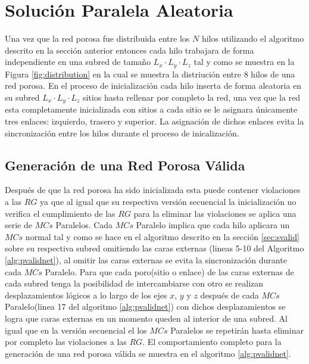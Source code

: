 \section{Solución Paralela Aleatoria}
\label{sec:pbiasedrg}
Una vez que la red porosa fue distribuida entre los $N$ hilos utilizando el algoritmo descrito en la sección anterior entonces cada hilo trabajara de forma independiente en una subred de tamaño $L_x \cdot L_y \cdot L_z$ tal y como se muestra en la Figura \ref{fig:distribution} en la cual se muestra la distriuci\'on entre $8$ hilos de una red porosa. En el proceso de inicializaci\'on cada hilo inserta de forma aleatoria en su subred $L_x \cdot L_y \cdot L_z$ sitios hasta rellenar por completo la red, una vez que la red esta completamente inicializada con sitios a cada sitio se le asignara únicamente tres enlaces: izquierdo, trasero y superior. La asignación de dichos enlaces evita la sincronización entre los hilos durante el proceso de inicalización.

\subsection{Generación de una Red Porosa Válida}
\label{subsec:pbiasedrgvalid}
Después de que la red porosa ha sido inicializada esta puede contener violaciones a las $RG$ ya que al igual que su respectiva versi\'on secuencial la inicializaci\'on no verifica el cumplimiento de las $RG$ para la eliminar las violaciones se aplica una serie de $MCs$ Paralelos. Cada $MCs$ Paralelo implica que cada hilo aplicara un $MCs$ normal tal y como se hace en el algoritmo descrito en la secci\'on \ref{sec:svalid} sobre su respectiva subred omitiendo las caras externas (lineas 5-10 del Algoritmo \ref{alg:pvalidnet}), al omitir las caras externas se evita la sincronizaci\'on durante cada $MCs$ Paralelo. Para que cada poro(sitio o enlace) de las caras externas de cada subred tenga la posibilidad de intercambiarse con otro se realizan desplazamientos lógicos a lo largo de los ejes $x$, $y$ y $z$ después de cada $MCs$ Paralelo(linea 17 del algoritmo \ref{alg:pvalidnet}) con dichos desplazamientos se logra que caras externas en un momento queden al interior de una subred. Al igual que en la versi\'on secuencial el los $MCs$ Paralelos se repetirán hasta eliminar por completo las violaciones a las $RG$. El comportamiento completo para la generación de una red porosa v\'alida se muestra en el algoritmo \ref{alg:pvalidnet}.\\

